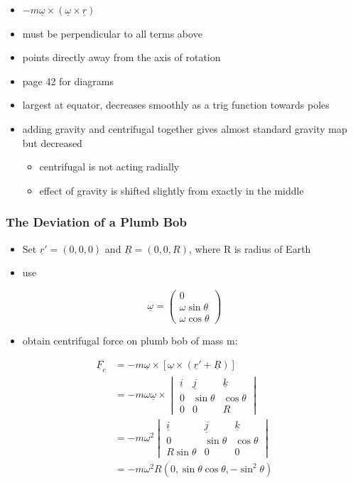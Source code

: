 \documentclass[a4paper,11pt,normalem]{article}
\begin{document}
\begin{itemize}
\item
  \(-m\underline{\omega} \times (\underline{\omega} \times \underline{r})\)
\item
  must be perpendicular to all terms above
\item
  points directly away from the axis of rotation
\item
  page 42 for diagrams
\item
  largest at equator, decreases smoothly as a trig function towards
  poles
\item
  adding gravity and centrifugal together gives almost standard gravity
  map but decreased
  \begin{itemize}
  \item
    centrifugal is not acting radially
  \item
    effect of gravity is shifted slightly from exactly in the middle
  \end{itemize}
\end{itemize}

\subsubsection{The Deviation of a Plumb Bob}\label{the-deviation-of-a-plumb-bob}

\begin{itemize}
\item
  Set \(\underline{r}' = (0, 0, 0)\) and \(\underline{R} = (0,0,R)\),
  where R is radius of Earth
\item
  use
\end{itemize}

\[
    \underline{\omega} = \begin{pmatrix} 0 \\ \omega\sin\theta \\ \omega\cos\theta \end{pmatrix}
\]

\begin{itemize}
\item
  obtain centrifugal force on plumb bob of mass m:
\end{itemize}

\[
    \begin{aligned}
    \underline{F}_{c} &= -m\underline{\omega} \times [\underline{\omega} \times (\underline{r}' + \underline{R})] \\
    &= -m\omega\underline{\omega} \times \begin{vmatrix} \underline{i} & \underline{j} & \underline{k} \\
    0 & \sin\theta & \cos\theta \\
    0 & 0 & R \end{vmatrix} \\
    &= -m\omega^2 \begin{vmatrix} \underline{i} & \underline{j} & \underline{k} \\ 0 & \sin\theta & \cos\theta \\ R\sin\theta & 0 & 0\end{vmatrix} \\
    &= -m\omega^2R(0, \sin\theta\cos\theta, -\sin^2\theta)
    \end{aligned}
\]
\end{document}

